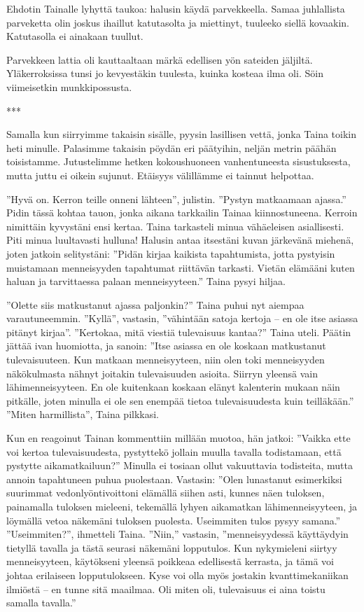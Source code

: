 ﻿\documentclass[a4paper, 12pt, finnish]{article}
\newcommand{\q}[1]{''#1''}  %
\begin{document}
Ehdotin Tainalle lyhyttä taukoa: halusin käydä parvekkeella. Samaa
juhlallista parveketta olin joskus ihaillut katutasolta
ja miettinyt, tuuleeko siellä kovaakin. Katutasolla ei ainakaan tuullut.

Parvekkeen lattia oli kauttaaltaan märkä edellisen yön sateiden
jäljiltä. Yläkerroksissa tunsi jo kevyestäkin tuulesta, kuinka
kosteaa ilma oli. Söin viimeisetkin munkkipossusta.

***

Samalla kun siirryimme takaisin sisälle, pyysin lasillisen vettä,
jonka Taina toikin heti minulle. Palasimme takaisin pöydän eri
päätyihin, neljän metrin päähän toisistamme.
Jutustelimme hetken kokoushuoneen vanhentuneesta sisustuksesta,
mutta juttu ei oikein sujunut. Etäisyys välillämme ei tainnut helpottaa.

\q{Hyvä on. Kerron teille onneni lähteen}, julistin.
\q{Pystyn matkaamaan ajassa.} Pidin tässä kohtaa
tauon, jonka aikana tarkkailin Tainaa kiinnostuneena.
Kerroin nimittäin kyvystäni ensi kertaa. Taina tarkasteli
minua vähäeleisen asiallisesti. Piti minua luultavasti hulluna!
Halusin antaa itsestäni kuvan järkevänä miehenä, joten
jatkoin selitystäni: \q{Pidän kirjaa kaikista tapahtumista,
jotta pystyisin muistamaan menneisyyden tapahtumat riittävän
tarkasti. Vietän elämääni kuten haluan ja tarvittaessa
palaan menneisyyteen.} Taina pysyi hiljaa.

\q{Olette siis matkustanut ajassa paljonkin?} Taina puhui nyt
aiempaa varautuneemmin.
\q{Kyllä}, vastasin, \q{vähintään satoja kertoja -- en ole
itse asiassa pitänyt kirjaa}.
\q{Kertokaa, mitä viestiä tulevaisuus kantaa?} Taina uteli.
Päätin jättää ivan huomiotta, ja sanoin:
\q{Itse asiassa en ole koskaan matkustanut
tulevaisuuteen. Kun matkaan menneisyyteen, niin
olen toki menneisyyden näkökulmasta nähnyt joitakin
tulevaisuuden asioita. Siirryn yleensä vain
lähimenneisyyteen. En ole kuitenkaan koskaan elänyt
kalenterin mukaan näin pitkälle, joten minulla
ei ole sen enempää tietoa tulevaisuudesta kuin teilläkään.}
\q{Miten harmillista}, Taina pilkkasi.

Kun en reagoinut Tainan kommenttiin millään muotoa, hän jatkoi:
\q{Vaikka ette voi kertoa tulevaisuudesta, pystyttekö jollain muulla
tavalla todistamaan, että pystytte aikamatkailuun?}
Minulla ei tosiaan ollut vakuuttavia todisteita, mutta annoin tapahtuneen
puhua puolestaan. Vastasin: \q{Olen lunastanut esimerkiksi
suurimmat vedonlyöntivoittoni elämällä siihen asti,
kunnes näen tuloksen, painamalla tuloksen mieleeni,
tekemällä lyhyen aikamatkan lähimenneisyyteen,
ja löymällä vetoa näkemäni tuloksen puolesta. Useimmiten tulos pysyy samana.}
\q{Useimmiten?}, ihmetteli Taina.
\q{Niin,} vastasin, \q{menneisyydessä käyttäydyin tietyllä tavalla
ja tästä seurasi näkemäni lopputulos. Kun nykymieleni siirtyy
menneisyyteen, käytökseni yleensä poikkeaa edellisestä kerrasta,
ja tämä voi johtaa erilaiseen lopputulokseen. Kyse voi olla myös
jostakin kvanttimekaniikan ilmiöstä -- en tunne sitä maailmaa.
Oli miten oli, tulevaisuus ei aina toistu samalla tavalla.}
\end{document}
